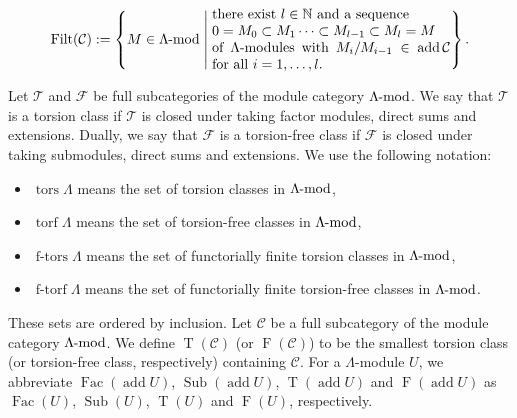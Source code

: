 \documentclass[pdftex,a4paper]{article}
\numberwithin{equation}{subsection}
\theoremstyle{definition}
\newcommand{\setmid}{\; \middle|\;}
\newcommand{\lmod}{\operatorname{\mathrm{\hspace{-2pt}-mod}}}
\newcommand{\add}{\operatorname{\mathrm{add}}}
\newcommand{\tors}{\operatorname{\mathrm{tors}}}
\newcommand{\torf}{\operatorname{\mathrm{torf}}}
\newcommand{\ftors}{\operatorname{\mathrm{f-tors}}}
\newcommand{\ftorf}{\operatorname{\mathrm{f-torf}}}
\newcommand{\Fac}{\operatorname{\mathrm{Fac}}}
\newcommand{\Sub}{\operatorname{\mathrm{Sub}}}
\newcommand{\Filt}{\operatorname{\mathrm{Filt}}}
\newcommand{\torscl}{\operatorname{\mathrm{T}}}
\newcommand{\torfcl}{\operatorname{\mathrm{F}}}
\begin{document}
\begin{equation}
	\Filt(\mathcal{C}):=\left\{M \in \Lambda\lmod \setmid \parbox{6cm}{there exist \(l\in\mathbb{N}\) and a sequence \\ \(0=M_0\subset M_1\cdots \subset M_{l-1}\subset M_l=M\) \\of \(\Lambda\)-modules with \(M_{i}/M_{i-1} \in \add \mathcal{C}\) for all \(i=1, \ldots, l\).}
	\right\}.
\end{equation}

Let \(\mathcal{T}\) and \(\mathcal{F}\) be full subcategories of the module category \(\Lambda\lmod\).
We say that \(\mathcal{T}\) is a torsion class if \(\mathcal{T}\) is closed under taking factor modules, direct sums and extensions.
Dually, we say that \(\mathcal{F}\) is a torsion-free class if \(\mathcal{F}\) is closed under taking submodules, direct sums and extensions.
We use the following notation:
\begin{itemize}
	\item \(\tors \Lambda\) means the set of torsion classes in \(\Lambda \lmod\),
	\item \(\torf \Lambda\) means the set of torsion-free classes in \(\Lambda \lmod\),
	\item \(\ftors \Lambda\) means the set of functorially finite torsion classes in \(\Lambda \lmod\),
	\item \(\ftorf \Lambda\) means the set of functorially finite torsion-free classes in \(\Lambda \lmod\).
\end{itemize}

These sets are ordered by inclusion.
Let \(\mathcal{C}\) be a full subcategory of the module category \(\Lambda \lmod\).
We define \(\torscl(\mathcal{C})\) (or \(\torfcl(\mathcal{C})\)) to be the smallest torsion class (or torsion-free class, respectively) containing \(\mathcal{C}\).
For a \(\Lambda\)-module \(U\),
we abbreviate \(\Fac(\add U)\), \(\Sub(\add U)\), \(\torscl (\add U)\) and \(\torfcl (\add U)\) as \(\Fac(U)\), \(\Sub(U)\), \(\torscl(U)\) and \(\torfcl(U)\), respectively.
\end{document}
